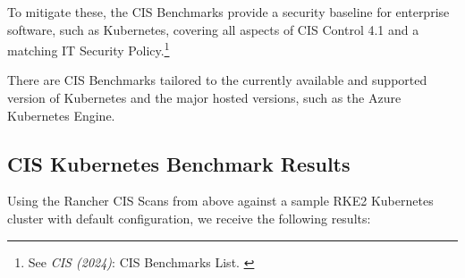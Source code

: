 To mitigate these, the CIS Benchmarks provide a security baseline for enterprise software, such as Kubernetes, covering all aspects of CIS Control 4.1 and a matching IT Security Policy.\footnote{See \textit{CIS (2024)}: CIS Benchmarks List. \cite{cisBenchmarks}}

There are CIS Benchmarks tailored to the currently available and supported version of Kubernetes and the major hosted versions, such as the Azure Kubernetes Engine.

\subsection{CIS Kubernetes Benchmark Results}

Using the Rancher CIS Scans from above against a sample RKE2 Kubernetes cluster with default configuration, we receive the following results:


